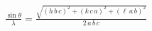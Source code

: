 


\begin{eqnarray*}
  \frac{\sin \theta}{\lambda} = \frac{\sqrt{\left(h\,b\,c\right)^2 + \left(k\,c\,a\right)^2 + \left(\ell\,a\,b\right)^2}}{2\,a\,b\,c}
\end{eqnarray*}

